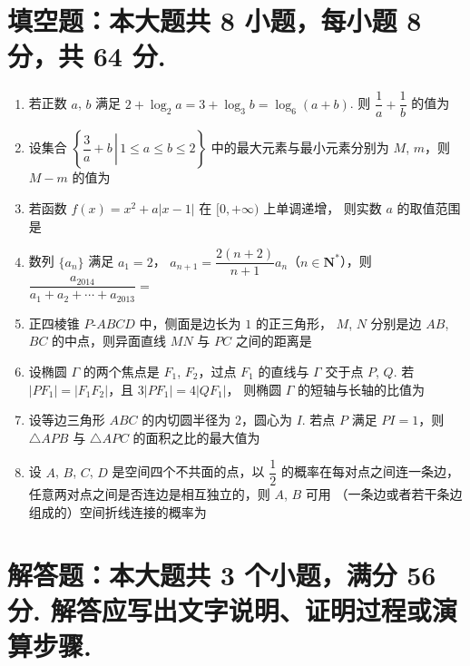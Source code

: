\documentclass{chsmc}
\begin{document}
\section{填空题：本大题共 8 小题，每小题 8 分，共 64 分.}

\begin{enumerate}
	\item 若正数 $a$, $b$ 满足
		$2 + \log_2 a = 3 + \log_3 b = \log_6(a+b)$.
		则 $\dfrac{1}{a} + \dfrac{1}{b}$ 的值为 \blankline
	\item 设集合
		$\left\{\left.\dfrac{3}{a} + b\,\right|\, 1 \leqslant a \leqslant b \leqslant 2\right\}$
		中的最大元素与最小元素分别为 $M$, $m$，则 $M-m$ 的值为 \blankline
	\item 若函数 $f(x) = x^2 + a|x-1|$ 在 $[0,+\infty)$ 上单调递增，
		则实数 $a$ 的取值范围是 \blankline
	\item 数列 $\{a_n\}$ 满足 $a_1 = 2$，
		$a_{n+1} = \dfrac{2(n+2)}{n+1}a_n$（$n \in \mathbf{N}^*$），则
		$\dfrac{a_{2014}}{a_1 + a_2 + \cdots + a_{2013}} =$ \blankline
	\item 正四棱锥 $P$-$ABCD$ 中，侧面是边长为 $1$ 的正三角形，
		$M$, $N$ 分别是边 $AB$, $BC$ 的中点，则异面直线 $MN$ 与 $PC$ 之间的距离是 \blankline
	\item 设椭圆 $\Gamma$ 的两个焦点是 $F_1$, $F_2$，过点 $F_1$ 的直线与 $\Gamma$ 交于点 $P$, $Q$.
		若 $|PF_1| = |F_1F_2|$，且 $3|PF_1| = 4|QF_1|$，
		则椭圆 $\Gamma$ 的短轴与长轴的比值为 \blankline
	\item 设等边三角形 $ABC$ 的内切圆半径为 $2$，圆心为 $I$.
		若点 $P$ 满足 $PI = 1$，则 $\triangle APB$ 与 $\triangle APC$ 的面积之比的最大值为 \blankline
	\item 设 $A$, $B$, $C$, $D$ 是空间四个不共面的点，以 $\dfrac{1}{2}$ 的概率在每对点之间连一条边，
		任意两对点之间是否连边是相互独立的，则 $A$, $B$ 可用
		（一条边或者若干条边组成的）空间折线连接的概率为 \blankline
\end{enumerate}

\section{解答题：本大题共 3 个小题，满分 56 分. 解答应写出文字说明、证明过程或演算步骤.}
\end{document}
